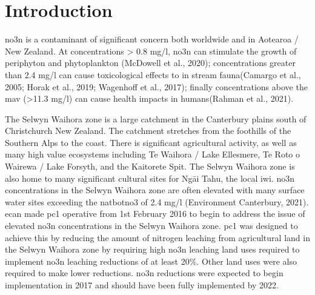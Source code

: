 
\section[Introduction]{Introduction} \label{sec:intro}

\gls{no3n} is a contaminant of significant concern both worldwide and in Aotearoa / New Zealand.
At concentrations > 0.8 mg/l, \gls{no3n} can stimulate the growth of periphyton and phytoplankton
(McDowell et al., 2020); concentrations greater than 2.4 mg/l can cause toxicological effects to in stream fauna(Camargo
et al., 2005; Horak et al., 2019; Wagenhoff et al., 2017); finally concentrations above the \gls{mav} (>11.3 mg/l) can cause health impacts in humans(Rahman et al., 2021).

The Selwyn Waihora zone is a large catchment in the Canterbury plains south of Christchurch New Zealand. The catchment stretches from the foothills of the Southern Alps to the coast. There is significant agricultural activity, as well as many high value ecosystems including Te Waihora / Lake Ellesmere, Te Roto o Wairewa / Lake Forsyth, and the Kaitorete Spit. The Selwyn Waihora zone is also home to many significant cultural sites for Ngāi Tahu, the local iwi. \gls{no3n} concentrations in the Selwyn Waihora zone are often elevated with many surface water sites exceeding the \gls{natbotno3} of 2.4 mg/l (Environment Canterbury, 2021). \gls{ecan} made \gls{pc1} operative from 1st February 2016 to begin to address the issue of elevated \gls{no3n} concentrations in the Selwyn Waihora zone. \gls{pc1} was designed to achieve this by reducing the amount of nitrogen leaching from agricultural land in the Selwyn Waihora zone by requiring high \gls{no3n} leaching land uses required to implement \gls{no3n} leaching reductions of at least 20\%. Other land uses were also required to make lower reductions. \gls{no3n} reductions were expected to begin implementation in 2017 and should have been fully implemented by 2022.

